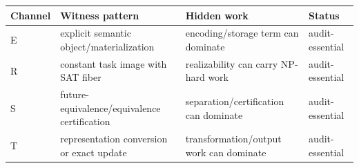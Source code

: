 \begin{tabularx}{\textwidth}{lXXl}
\toprule
Channel & Witness pattern & Hidden work & Status \\
\midrule
E & explicit semantic object/materialization & encoding/storage term can dominate & audit-essential \\
R & constant task image with SAT fiber & realizability can carry NP-hard work & audit-essential \\
S & future-equivalence/equivalence certification & separation/certification can dominate & audit-essential \\
T & representation conversion or exact update & transformation/output work can dominate & audit-essential \\
\bottomrule
\end{tabularx}
